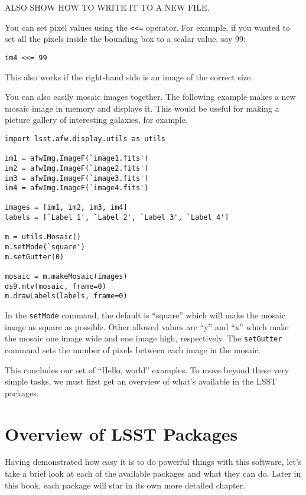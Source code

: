 \documentclass{book}
\begin{document}
ALSO SHOW HOW TO WRITE IT TO A NEW FILE.

You can set pixel values using the \texttt{<<=} operator.  For
example, if you wanted to set all the pixels inside the bounding box to a
scalar value, say 99:

\begin{verbatim}
im4 <<= 99
\end{verbatim}

This also works if the right-hand side is an image of the correct size.

You can also easily mosaic images together.  The following example
makes a new mosaic image in memory and displays it.  This would be
useful for making a picture gallery of interesting galaxies, for
example.

\begin{verbatim}
import lsst.afw.display.utils as utils

im1 = afwImg.ImageF(`image1.fits')
im2 = afwImg.ImageF(`image2.fits')
im3 = afwImg.ImageF(`image3.fits')
im4 = afwImg.ImageF(`image4.fits')

images = [im1, im2, im3, im4]
labels = [`Label 1', `Label 2', `Label 3', `Label 4']

m = utils.Mosaic()
m.setMode(`square')
m.setGutter(0)

mosaic = m.makeMosaic(images)
ds9.mtv(mosaic, frame=0)
m.drawLabels(labels, frame=0)
\end{verbatim}

In the \texttt{setMode} command, the default is ``square'' which will
make the mosaic image as square as possible.  Other allowed values are
``y'' and ``x'' which make the mosaic one image wide and one image
high, respectively.  The \texttt{setGutter} command sets the number of
pixels between each image in the mosaic.


\vskip0.5in

This concludes our set of ``Hello, world'' examples.  To move beyond
these very simple tasks, we must first get an overview of what's
available in the LSST packages.

\chapter{Overview of LSST Packages\label{chap-overview}}

Having demonstrated how easy it is to do powerful things with this
software, let's take a brief look at each of the available packages
and what they can do.  Later in this book, each package will star in
its own more detailed chapter.
\end{document}
